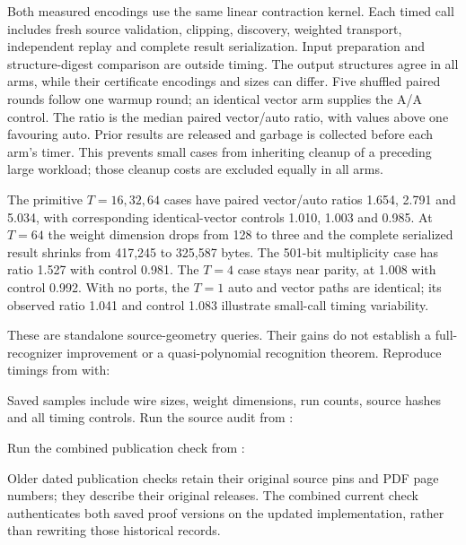 Both measured encodings use the same linear contraction kernel. Each timed
call includes fresh source validation, clipping, discovery, weighted
transport, independent replay and complete result serialization. Input
preparation and structure-digest comparison are outside timing. The output
structures agree in all arms, while their certificate encodings and sizes
can differ. Five shuffled paired rounds follow one warmup round; an
identical vector arm supplies the A/A control. The ratio is the median
paired vector/auto ratio, with values above one favouring auto.
Prior results are released and garbage is collected before each arm's
timer. This prevents small cases from inheriting cleanup of a preceding
large workload; those cleanup costs are excluded equally in all arms.


The primitive $T=16,32,64$ cases have paired vector/auto ratios
1.654, 2.791 and 5.034, with corresponding identical-vector controls
1.010, 1.003 and 0.985. At $T=64$ the weight dimension drops from 128 to
three and the complete serialized result shrinks from 417,245 to 325,587
bytes. The 501-bit multiplicity case has ratio 1.527 with control 0.981.
The $T=4$ case stays near parity, at 1.008 with control 0.992. With no
ports, the $T=1$ auto and vector paths are identical; its observed ratio
1.041 and control 1.083 illustrate small-call timing variability.

These are standalone source-geometry queries. Their gains do not establish
a full-recognizer improvement or a quasi-polynomial recognition theorem.
Reproduce timings from  with:
\begin{quote}\small
{}
\end{quote}
Saved samples include wire sizes, weight dimensions, run counts, source
hashes and all timing controls. Run the source audit from :
\begin{quote}\footnotesize
{}
\end{quote}
Run the combined publication check from :
\begin{quote}\small
{}
\end{quote}
Older dated publication checks retain their original
source pins and PDF page numbers; they describe their original releases.
The combined current check authenticates both saved proof versions on the
updated implementation, rather than rewriting those historical records.
